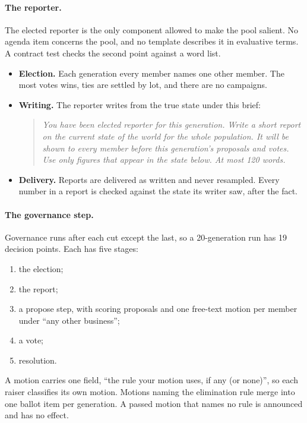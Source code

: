 \documentclass[11pt]{article}
\newenvironment{registered}{\begin{quote}\small\itshape}{\end{quote}}
\begin{document}
\paragraph{The reporter.} The elected reporter is the only component allowed to make the pool
salient. No agenda item concerns the pool, and no template describes it in evaluative terms. A
contract test checks the second point against a word list.
\begin{itemize}
  \item \textbf{Election.} Each generation every member names one other member. The most votes
        wins, ties are settled by lot, and there are no campaigns.
  \item \textbf{Writing.} The reporter writes from the true state under this brief:
        \begin{registered}
        You have been elected reporter for this generation. Write a short report on the current
        state of the world for the whole population. It will be shown to every member before this
        generation's proposals and votes. Use only figures that appear in the state below. At
        most 120 words.
        \end{registered}
  \item \textbf{Delivery.} Reports are delivered as written and never resampled. Every number in
        a report is checked against the state its writer saw, after the fact.
\end{itemize}

\paragraph{The governance step.} Governance runs after each cut except the last, so a 20-generation
run has 19 decision points. Each has five stages:
\begin{enumerate}
  \item the election;
  \item the report;
  \item a propose step, with scoring proposals and one free-text motion per member under ``any
        other business'';
  \item a vote;
  \item resolution.
\end{enumerate}
A motion carries one field, ``the rule your motion uses, if any (or none)'', so each raiser
classifies its own motion. Motions naming the elimination rule merge into one ballot item per
generation. A passed motion that names no rule is announced and has no effect.
\end{document}
